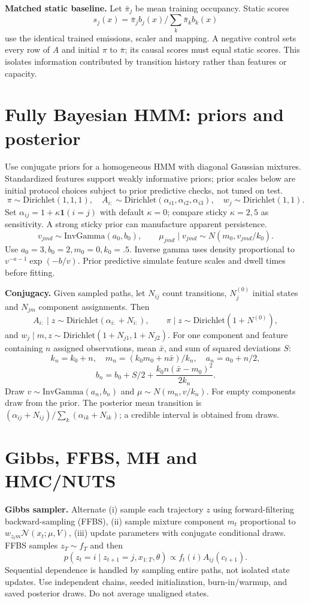 \documentclass[11pt,letterpaper]{article}
\newcommand{\sectionpage}[1]{\clearpage\section{#1}}
\begin{document}
\textbf{Matched static baseline.} Let $\bar\pi_j$ be mean training occupancy. Static scores \[s_j(x)=\bar\pi_jb_j(x)/\sum_k\bar\pi_kb_k(x)\] use the identical trained emissions, scaler and mapping. A negative control sets every row of $A$ and initial $\pi$ to $\bar\pi$; its causal scores must equal static scores. This isolates information contributed by transition history rather than features or capacity.

\sectionpage{Fully Bayesian HMM: priors and posterior}
Use conjugate priors for a homogeneous HMM with diagonal Gaussian mixtures. Standardized features support weakly informative priors; prior scales below are initial protocol choices subject to prior predictive checks, not tuned on test.
\[
\pi\sim\mathrm{Dirichlet}(1,1,1),\quad
A_{i:}\sim\mathrm{Dirichlet}(\alpha_{i1},\alpha_{i2},\alpha_{i3}),
\quad w_j\sim\mathrm{Dirichlet}(1,1).
\]
Set $\alpha_{ij}=1+\kappa\mathbf 1(i=j)$ with default $\kappa=0$; compare sticky $\kappa=2,5$ as sensitivity. A strong sticky prior can manufacture apparent persistence.
\[
v_{jmd}\sim\mathrm{InvGamma}(a_0,b_0),\qquad
\mu_{jmd}\mid v_{jmd}\sim N(m_0,v_{jmd}/k_0).
\]
Use $a_0=3,b_0=2,m_0=0,k_0=.5$. Inverse gamma uses density proportional to $v^{-a-1}\exp(-b/v)$. Prior predictive simulate feature scales and dwell times before fitting.

\textbf{Conjugacy.} Given sampled paths, let $N_{ij}$ count transitions, $N_j^{(0)}$ initial states and $N_{jm}$ component assignments. Then
\[
A_{i:}\mid z\sim\mathrm{Dirichlet}(\alpha_{i:}+N_{i:}),\qquad
\pi\mid z\sim\mathrm{Dirichlet}(1+N^{(0)}),
\]
and $w_j\mid m,z\sim\mathrm{Dirichlet}(1+N_{j1},1+N_{j2})$.
For one component and feature containing $n$ assigned observations, mean $\bar x$, and sum of squared deviations $S$:
\[
k_n=k_0+n,\quad m_n=(k_0m_0+n\bar x)/k_n,\quad a_n=a_0+n/2,
\]
\[
b_n=b_0+S/2+\frac{k_0n(\bar x-m_0)^2}{2k_n}.
\]
Draw $v\sim\mathrm{InvGamma}(a_n,b_n)$ and $\mu\sim N(m_n,v/k_n)$. For empty components draw from the prior. The posterior mean transition is $(\alpha_{ij}+N_{ij})/\sum_k(\alpha_{ik}+N_{ik})$; a credible interval is obtained from draws.

\sectionpage{Gibbs, FFBS, MH and HMC/NUTS}
\textbf{Gibbs sampler.} Alternate (i) sample each trajectory $z$ using forward-filtering backward-sampling (FFBS), (ii) sample mixture component $m_t$ proportional to $w_{z_tm}\mathcal N(x_t;\mu,V)$, (iii) update parameters with conjugate conditional draws. FFBS samples $z_T\sim f_T$ and then
\[
p(z_t=i\mid z_{t+1}=j,x_{1:T},\theta)\propto f_t(i)A_{ij}(c_{t+1}).
\]
Sequential dependence is handled by sampling entire paths, not isolated state updates. Use independent chains, seeded initialization, burn-in/warmup, and saved posterior draws. Do not average unaligned states.
\end{document}

